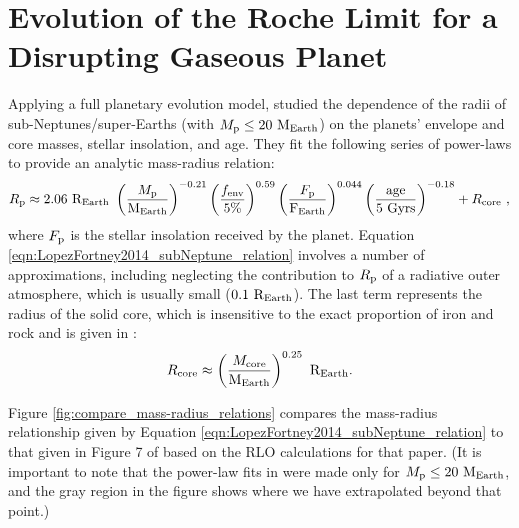 \documentclass{svjour3}                     %
\begin{document}
\section{Evolution of the Roche Limit for a Disrupting Gaseous Planet}
\label{sec:Evolution_of_the_Roche_Limit_for_a_Disrupting_Gaseous_Planet}
Applying a full planetary evolution model, \cite{Lopez2014Understanding} studied the dependence of the radii of sub-Neptunes/super-Earths (with $M_{\rm p} \le 20\ {\rm M_{Earth}}$) on the planets' envelope and core masses, stellar insolation, and age. They fit the following series of power-laws to provide an analytic mass-radius relation:
\begin{equation}
R_{\rm p} \approx 2.06\ {\rm R_{Earth}}\ \left( \dfrac{M_{\rm p}}{\rm M_{Earth}} \right)^{-0.21} \left( \dfrac{f_{\rm env}}{5\%} \right)^{0.59} \left( \dfrac{F_{\rm p}}{\rm F_{Earth}} \right)^{0.044} \left( \dfrac{\rm age}{\rm 5\ Gyrs} \right)^{-0.18} + R_{\rm core}\  ,
\label{eqn:LopezFortney2014_subNeptune_relation}
\end{equation}
where $F_{\rm p}$ is the stellar insolation received by the planet. Equation \ref{eqn:LopezFortney2014_subNeptune_relation} involves a number of approximations, including neglecting the contribution to $R_{\rm p}$ of a radiative outer atmosphere, which is usually small ($0.1\ {\rm R_{Earth}}$). The last term represents the radius of the solid core, which is insensitive to the exact proportion of iron and rock and is given in \cite{Lopez2014Understanding}:
\begin{equation}
R_{\rm core} \approx \left( \dfrac{M_{\rm core}}{\rm M_{Earth}} \right)^{0.25}\ {\rm R_{Earth}}. 
\label{eqn:LopezFortney2014_rockyplanet_relation}
\end{equation}

Figure \ref{fig:compare_mass-radius_relations} compares the mass-radius relationship given by Equation \ref{eqn:LopezFortney2014_subNeptune_relation} to that given in Figure 7 of \cite{2015ApJ...813..101V} based on the RLO calculations for that paper. (It is important to note that the power-law fits in \cite{Lopez2014Understanding} were made only for $M_{\rm p} \le 20\ {\rm M_{Earth}}$, and the gray region in the figure shows where we have extrapolated beyond that point.) 
\end{document}
